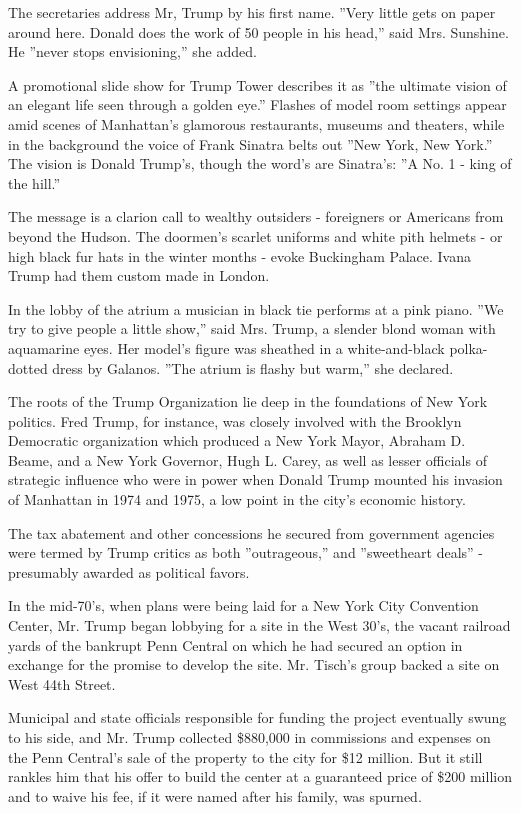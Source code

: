 The secretaries address Mr, Trump by his first name. ''Very little gets
on paper around here. Donald does the work of 50 people in his head,''
said Mrs. Sunshine. He ''never stops envisioning,'' she added.

A promotional slide show for Trump Tower describes it as ''the ultimate
vision of an elegant life seen through a golden eye.'' Flashes of model
room settings appear amid scenes of Manhattan's glamorous restaurants,
museums and theaters, while in the background the voice of Frank Sinatra
belts out ''New York, New York.'' The vision is Donald Trump's, though
the word's are Sinatra's: ''A No. 1 - king of the hill.''

The message is a clarion call to wealthy outsiders - foreigners or
Americans from beyond the Hudson. The doormen's scarlet uniforms and
white pith helmets - or high black fur hats in the winter months - evoke
Buckingham Palace. Ivana Trump had them custom made in London.

In the lobby of the atrium a musician in black tie performs at a pink
piano. ''We try to give people a little show,'' said Mrs. Trump, a
slender blond woman with aquamarine eyes. Her model's figure was
sheathed in a white-and-black polka-dotted dress by Galanos. ''The
atrium is flashy but warm,'' she declared.

The roots of the Trump Organization lie deep in the foundations of New
York politics. Fred Trump, for instance, was closely involved with the
Brooklyn Democratic organization which produced a New York Mayor,
Abraham D. Beame, and a New York Governor, Hugh L. Carey, as well as
lesser officials of strategic influence who were in power when Donald
Trump mounted his invasion of Manhattan in 1974 and 1975, a low point in
the city's economic history.

The tax abatement and other concessions he secured from government
agencies were termed by Trump critics as both ''outrageous,'' and
''sweetheart deals'' - presumably awarded as political favors.

In the mid-70's, when plans were being laid for a New York City
Convention Center, Mr. Trump began lobbying for a site in the West 30's,
the vacant railroad yards of the bankrupt Penn Central on which he had
secured an option in exchange for the promise to develop the site. Mr.
Tisch's group backed a site on West 44th Street.

Municipal and state officials responsible for funding the project
eventually swung to his side, and Mr. Trump collected \$880,000 in
commissions and expenses on the Penn Central's sale of the property to
the city for \$12 million. But it still rankles him that his offer to
build the center at a guaranteed price of \$200 million and to waive his
fee, if it were named after his family, was spurned.

